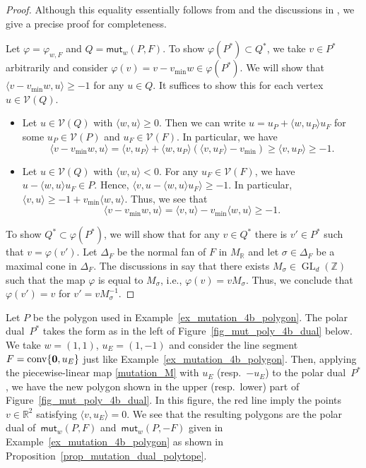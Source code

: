 \documentclass[pdftex]{sigma}%
\numberwithin{equation}{section}
\numberwithin{figure}{section}
\numberwithin{table}{section}
\newcommand{\ZZ}{\mathbb{Z}}
\newcommand{\RR}{\mathbb{R}}
\newcommand{\calV}{\mathcal{V}}
\newcommand{\GL}{\operatorname{GL}}
\newcommand{\mut}{\mathsf{mut}}
\begin{document}
\begin{proof}
Although this equality essentially follows from \cite[Proposition~4]{ACGK} and the discussions in \cite[p.~12]{ACGK}, we give a precise proof for completeness.

Let $\varphi=\varphi_{w,F}$ and $Q=\mut_w(P,F)$.
To show $\varphi(P^*)\subset Q^*$, we take $v \in P^*$ arbitrarily and consider $\varphi(v)=v - v_{\min}w \in \varphi(P^*)$.
We will show that $\langle v - v_{\min}w,u \rangle \geq -1$ for any $u \in Q$.
It suffices to show this for each vertex $u\in\calV(Q)$.
\begin{itemize}\itemsep=0pt
\item Let $u\in\calV(Q)$ with $\langle w,u \rangle \geq 0$. Then we can write $u=u_P+\langle w,u_P \rangle u_F$ for some $u_P \in \calV(P)$ and $u_F \in \calV(F)$.
In particular, we have
\begin{displaymath}
\langle v-v_{\min}w, u\rangle = \langle v,u_P \rangle + \langle w,u_P \rangle(\langle v,u_F \rangle-v_{\min}) \geq \langle v,u_P \rangle \geq -1.
\end{displaymath}

\item Let $u\in\calV(Q)$ with $\langle w,u \rangle < 0$. For any $u_F \in \calV(F)$, we have $u-\langle w,u \rangle u_F \in P$.
Hence, $\langle v,u-\langle w,u \rangle u_F \rangle \geq -1$. In particular, $\langle v,u \rangle \geq -1 + v_{\min} \langle w,u \rangle$. Thus, we see that
\begin{displaymath}
\langle v-v_{\min}w, u\rangle =\langle v, u\rangle - v_{\min} \langle w, u\rangle \geq -1.
\end{displaymath}
\end{itemize}

To show $Q^*\subset\varphi(P^*)$, we will show that for any $v \in Q^*$ there is $v' \in P^*$ such that $v=\varphi(v')$.
Let $\Delta_F$ be the normal fan of $F$ in $M_\RR$ and let $\sigma \in \Delta_F$ be a maximal cone in $\Delta_F$.
The discussions in \cite[p.~12]{ACGK} say that there exists $M_\sigma \in \GL_d(\ZZ)$ such that the map $\varphi$ is equal to $M_\sigma$,
i.e., $\varphi(v)=vM_\sigma$. Thus, we conclude that $\varphi(v')=v$ for $v'=vM_\sigma^{-1}$.
\end{proof}

\begin{Example}\label{ex_mutation_4b_polygon_dual}
Let $P$ be the polygon used in Example~\ref{ex_mutation_4b_polygon}.
The polar dual~$P^*$ takes the form as in the left of Figure~\ref{fig_mut_poly_4b_dual} below.
We take $w=(1,1)$, $u_E=(1,-1)$ and consider the line segment $F=\operatorname{conv}\{{\bf 0},u_E\}$ just like Example~\ref{ex_mutation_4b_polygon}.
Then, applying the piecewise-linear map \eqref{mutation_M} with $u_E$ (resp.~$-u_E$) to the polar dual~$P^*$,
we have the new polygon shown in the upper (resp.\ lower) part of Figure~\ref{fig_mut_poly_4b_dual}.
In this figure, the red line imply the points $v\in\RR^2$ satisfying $\langle v,u_E \rangle =0$.
We see that the resulting polygons are the polar dual of~$\mut_w(P,F)$ and~$\mut_w(P,-F)$ given in Example~\ref{ex_mutation_4b_polygon}
as shown in Proposition~\ref{prop_mutation_dual_polytope}.
\end{Example}
\end{document}
